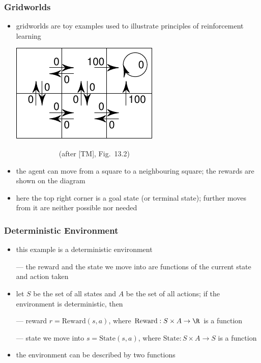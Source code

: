 \begin{frame}\frametitle{Gridworlds}
\begin{itemize}

\item gridworlds are toy examples used to illustrate principles of
reinforcement learning

\bigskip

\includegraphics[scale=1]{gridworld}
\begin{minipage}{5cm}
~~~~~~~~~~~~(after [TM], Fig.~13.2)
\end{minipage}

\item the agent can move from a square to a neighbouring square; the
rewards are shown on the diagram

\item here the top right corner is a \alert{goal state (or terminal
state)}; further moves from it are neither possible nor needed

\end{itemize}
\end{frame}

\begin{frame}\frametitle{Deterministic Environment}
\begin{itemize}

\item this example is a deterministic environment

--- the reward and the state we move into are functions of the current
    state and action taken

\item let $S$ be the set of all states and $A$ be the set of all
    actions; if the environment is deterministic, then


--- reward $r = \text{Reward}(s,a)$, where $\text{Reward}: S\times
    A\to \R$ is a function

--- state we move into $s = \text{State}(s,a)$, where $\text{State}:
    S\times A\to S$ is a function

\item the environment can be described by two functions

\end{itemize}
\end{frame}

